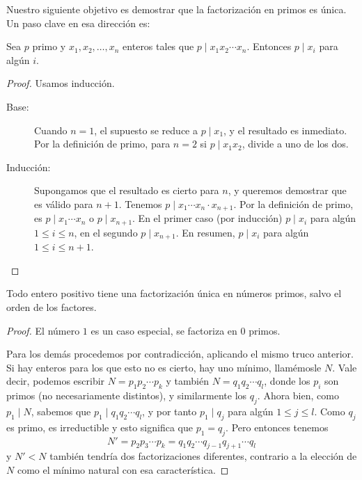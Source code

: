   Nuestro siguiente objetivo es demostrar
  que la factorización en primos es única.
  Un paso clave en esa dirección es:
  \begin{lemma}
    \label{lem:p-product}
    Sea \(p\) primo y \(x_1, x_2, \dotsc, x_n\) enteros
    tales que \(p \mid x_1 x_2 \dotsm x_n\).
    Entonces \(p \mid x_i\) para algún \(i\).
  \end{lemma}
  \begin{proof}
    Usamos inducción.%
    \begin{description}
    \item[Base:]
      Cuando \(n = 1\),
      el supuesto se reduce a \(p \mid x_1\),
      y el resultado es inmediato.
      Por la definición de primo,
      para  \(n = 2\)
      si \(p \mid x_1 x_2\),
      divide a uno de los dos.
    \item[Inducción:]
      Supongamos que el resultado es cierto para \(n\),
      y queremos demostrar que es válido para \(n + 1\).
      Tenemos \(p \mid x_1 \dotsm x_n \cdot x_{n + 1}\).
      Por la definición de primo,
      es \(p \mid x_1 \dotsm x_n\)
      o \(p \mid x_{n + 1}\).
      En el primer caso (por inducción) \(p \mid x_i\)
      para algún \(1 \le i \le n\),
      en el segundo \(p \mid x_{n + 1}\).
      En resumen,
      \(p \mid x_i\) para algún \(1 \le i \le n + 1\).
      \qedhere
    \end{description}
  \end{proof}

  \begin{theorem}
    \label{theo:fundamental-aritmetica}
    Todo entero positivo
    tiene una factorización única en números primos,
    salvo el orden de los factores.
  \end{theorem}
  \begin{proof}
    El número \(1\) es un caso especial,
    se factoriza en \(0\) primos.

    Para los demás procedemos por contradicción,%
    aplicando el mismo truco anterior.
    Si hay enteros para los que esto no es cierto,
    hay uno mínimo,
    llamémosle \(N\).
    Vale decir,
    podemos escribir \(N = p_1 p_2 \dotsm p_k\)
    y también \(N = q_1 q_2 \dotsm q_l\),
    donde los \(p_i\) son primos
    (no necesariamente distintos),
    y similarmente los \(q_j\).
    Ahora bien,
    como \(p_1 \mid N\),
    sabemos que \(p_1 \mid q_1 q_2 \dotsm q_l\),
    y por tanto \(p_1 \mid q_j\) para algún \(1 \le j \le l\).
    Como \(q_j\) es primo,
    es irreductible y esto significa que \(p_1 = q_j\).
    Pero entonces tenemos
    \begin{equation*}
      N'
	= p_2 p_3 \dotsm p_k
	= q_1 q_2 \dotsm q_{j - 1} q_{j + 1} \dotsm q_l
    \end{equation*}
    y  \(N' < N\) también tendría dos factorizaciones diferentes,
    contrario a la elección de \(N\) como el mínimo natural
    con esa característica.
  \end{proof}

